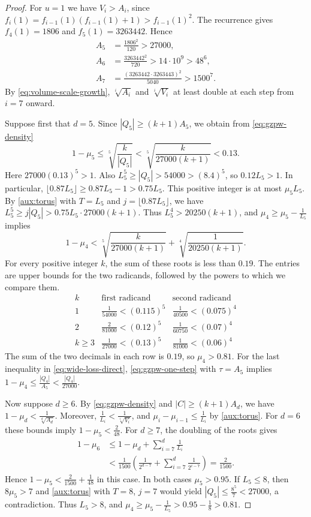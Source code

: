 \documentclass[reqno, 11pt]{article}
\numberwithin{equation}{section}
\theoremstyle{definition}
\begin{document}
\begin{proof}
For $u=1$ we have $V_i>A_i$, since
$f_i(1)=f_{i-1}(1)(f_{i-1}(1)+1)>f_{i-1}(1)^2$.
The recurrence gives $f_4(1)=1806$ and $f_5(1)=3263442$. Hence
\[
 \begin{aligned}
 A_5&=\frac{1806^2}{120}>27000,\\
 A_6&=\frac{3263442^2}{720}>14\cdot10^9>48^6,\\
 A_7&=\frac{(3263442\cdot3263443)^2}{5040}>1500^7 .
 \end{aligned}
\]
By \eqref{eq:volume-scale-growth}, $\sqrt[i]{A_i}$ and $\sqrt[i]{V_i}$
at least double at each step from $i=7$ onward.

Suppose first that $d=5$. Since $|Q_5|\ge(k+1)A_5$, we obtain from
\eqref{eq:gzpw-density}
\[
 1-\mu_5\le\sqrt[5]{\frac{k}{|Q_5|}}
 <\sqrt[5]{\frac{k}{27000(k+1)}}<0.13.
\]
Here $27000(0.13)^5>1$. Also $L_5^5\ge|Q_5|>54000>(8.4)^5$, so
$0.12L_5>1$. In particular,
$\lfloor0.87L_5\rfloor\ge0.87L_5-1>0.75L_5$.
This positive integer is at most $\mu_5 L_5$. By \cref{aux:torus}
with $T=L_5$ and $j=\lfloor0.87L_5\rfloor$, we have
$L_5^5\ge j|Q_5|>0.75L_5\cdot27000(k+1)$. Thus
$L_5^4>20250(k+1)$, and $\mu_4\ge\mu_5-\frac{1}{L_5}$ implies
\[
 1-\mu_4<
 \sqrt[5]{\frac{k}{27000(k+1)}}+
 \sqrt[4]{\frac{1}{20250(k+1)}} .
\]
For every positive integer $k$, the sum of these roots is less than $0.19$. The entries are upper bounds for the two
radicands, followed by the powers to which we compare them.
\[
\begin{array}{c|c|c}
 k & \text{first radicand} & \text{second radicand}\\ \hline
 1 & \frac{1}{54000}<(0.115)^5 & \frac{1}{40500}<(0.075)^4\\[2pt]
 2 & \frac{2}{81000}<(0.12)^5  & \frac{1}{60750}<(0.07)^4\\[2pt]
 k\ge3 & \frac{1}{27000}<(0.13)^5 & \frac{1}{81000}<(0.06)^4
\end{array}
\]
The sum of the two decimals in each row is $0.19$, so $\mu_4>0.81$.
For the last inequality in \eqref{eq:wide-loss-direct},
\eqref{eq:gzpw-one-step} with $\tau=A_5$ implies
$1-\mu_4\le\frac{|Q_4|}{A_5}<\frac{|Q_4|}{27000}$.

Now suppose $d\ge6$. By \eqref{eq:gzpw-density} and $|C|\ge(k+1)A_d$,
we have $1-\mu_d<\frac{1}{\sqrt[d]{A_d}}$. Moreover,
$\frac{1}{L_i}<\frac{1}{\sqrt[i]{V_i}}$, and
$\mu_i-\mu_{i-1}\le\frac{1}{L_i}$ by \cref{aux:torus}. For $d=6$
these bounds imply $1-\mu_5<\frac{2}{48}$. For $d\ge7$, the doubling
of the roots gives
\[
 \begin{aligned}
 1-\mu_6
 &\le1-\mu_d+\sum_{i=7}^{d}\frac{1}{L_i}\\
 &<\frac{1}{1500}
 \left(\frac{1}{2^{d-7}}+\sum_{i=7}^{d}\frac{1}{2^{i-7}}\right)
 =\frac{2}{1500}.
 \end{aligned}
\]
Hence $1-\mu_5<\frac{2}{1500}+\frac{1}{48}$ in this case.
In both cases $\mu_5>0.95$. If $L_5\le8$, then $8\mu_5>7$
and \cref{aux:torus} with $T=8$, $j=7$ would yield
$|Q_5|\le\frac{8^5}{7}<27000$, a contradiction. Thus $L_5>8$, and
$\mu_4\ge\mu_5-\frac{1}{L_5}>0.95-\frac{1}{8}>0.81$.


\end{proof}
\end{document}
